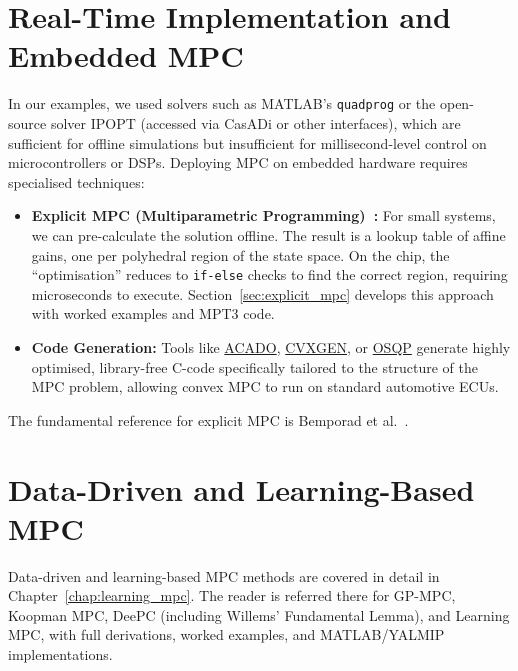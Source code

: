 \section{Real-Time Implementation and Embedded MPC}
In our examples, we used solvers such as MATLAB's \texttt{quadprog} or the open-source solver IPOPT (accessed via CasADi or other interfaces), which are sufficient for offline simulations but insufficient for millisecond-level control on microcontrollers or DSPs. Deploying MPC on embedded hardware requires specialised techniques:
\begin{itemize}
	\item \textbf{Explicit MPC (Multiparametric Programming)~\cite{Bemporad2002}:} For small systems, we can pre-calculate the solution offline. The result is a lookup table of affine gains, one per polyhedral region of the state space. On the chip, the ``optimisation'' reduces to \texttt{if-else} checks to find the correct region, requiring microseconds to execute. Section~\ref{sec:explicit_mpc} develops this approach with worked examples and MPT3 code.
	\item \textbf{Code Generation:} Tools like \href{https://acado.github.io/}{ACADO}, \href{https://cvxgen.com/}{CVXGEN}, or \href{https://osqp.org/}{OSQP} generate highly optimised, library-free C-code specifically tailored to the structure of the MPC problem, allowing convex MPC to run on standard automotive ECUs.
\end{itemize}

The fundamental reference for explicit MPC is Bemporad et al.~\cite{Bemporad2002}.

\section{Data-Driven and Learning-Based MPC}
Data-driven and learning-based MPC methods are covered in detail in Chapter~\ref{chap:learning_mpc}. The reader is referred there for GP-MPC, Koopman MPC, DeePC (including Willems' Fundamental Lemma), and Learning MPC, with full derivations, worked examples, and MATLAB/YALMIP implementations.

